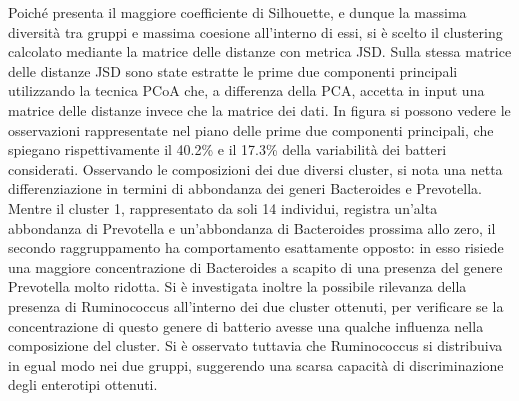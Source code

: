Poiché presenta il maggiore coefficiente di Silhouette, e dunque la massima diversità tra gruppi e massima coesione all’interno di essi, si è scelto il clustering calcolato mediante la matrice delle distanze con metrica JSD. 
Sulla stessa matrice delle distanze JSD sono state estratte le prime due componenti principali utilizzando la tecnica PCoA che, a differenza della PCA, accetta in input una matrice delle distanze invece che la matrice dei dati. In figura si possono vedere le osservazioni rappresentate nel piano delle prime due componenti principali, che spiegano rispettivamente il 40.2\% e il 17.3\% della variabilità dei batteri considerati. Osservando le composizioni dei due diversi cluster, si nota una netta differenziazione in termini di abbondanza dei generi Bacteroides e Prevotella. Mentre il cluster 1, rappresentato da soli 14 individui, registra un’alta abbondanza di Prevotella e un'abbondanza di Bacteroides prossima allo zero, il secondo raggruppamento ha comportamento esattamente opposto: in esso risiede una maggiore concentrazione di Bacteroides a scapito di una presenza del genere Prevotella molto ridotta.
Si è investigata inoltre la possibile rilevanza della presenza di Ruminococcus all’interno dei due cluster ottenuti, per verificare se la concentrazione di questo genere di batterio avesse una qualche influenza nella composizione del cluster. Si è osservato tuttavia che Ruminococcus si distribuiva in egual modo nei due gruppi, suggerendo una scarsa capacità di discriminazione degli enterotipi ottenuti.
\vspace*{1cm}
